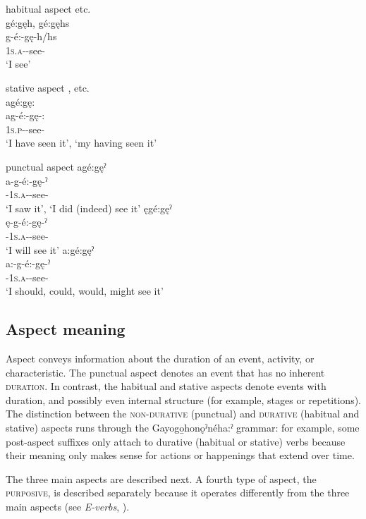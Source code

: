\ea\label{ex:aspectex2} habitual aspect  etc.\\
gé:gęh, gé:gęhs\\
\gll g-é:-gę-h/hs\\
\textsc{1s.a}-{\joinerE}-see-{\habitual}\\
\glt ‘I see’
\z

\FloatBarrier
\ea\label{ex:aspectex3} stative aspect \stem{-:}, etc.\\
agé:gę: \\
\gll ag-é:-gę-:\\
 \textsc{1s.p}-{\joinerE}-see-{\stative}\\
\glt ‘I have seen it’, `my having seen it'
\z


\ea\label{ex:punctaspectex} punctual aspect 
\ea agé:gęˀ \\
\gll a-g-é:-gę-ˀ\\
 {\factual}-\textsc{1s.a}-{\joinerE}-see-{\punctual}\\
\glt ‘I saw it’, `I did (indeed) see it'
\ex ęgé:gęˀ\\
\gll ę-g-é:-gę-ˀ\\
 \fut-\textsc{1s.a}-{\joinerE}-see-{\punctual}\\
\glt `I will see it'
\ex a:gé:gęˀ\\
\gll a:-g-é:-gę-ˀ\\
 {\indefinite}-\textsc{1s.a}-{\joinerE}-see-{\punctual}\\
\glt `I should, could, would, might see it'
\z
\z
 

\subsection{Aspect meaning} \label{Aspectual meaning}
Aspect conveys information about the duration of an event, activity, or characteristic. The punctual aspect denotes an event that has no inherent \textsc{duration}. In contrast, the habitual and stative aspects denote events with duration, and possibly even internal structure (for example, stages or repetitions). The distinction between the \textsc{non-durative} (punctual) and \textsc{durative} (habitual and stative) aspects runs through the Gayogo̱honǫˀnéha:ˀ grammar: for example, some post-aspect suffixes only attach to durative (habitual or stative) verbs because their meaning only makes sense for actions or happenings that extend over time.

The three main aspects are described next. A fourth type of aspect, the \textsc{purposive}, is described separately because it operates  differently from the three main aspects (see \textit{E-verbs}, ).  

